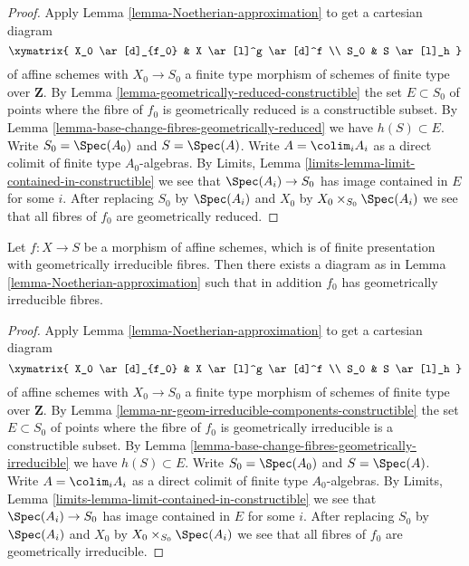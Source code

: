 \begin{proof}
Apply
Lemma \ref{lemma-Noetherian-approximation}
to get a cartesian diagram
$$
\xymatrix{
X_0 \ar[d]_{f_0} & X \ar[l]^g \ar[d]^f \\
S_0 & S \ar[l]_h
}
$$
of affine schemes with $X_0 \to S_0$ a finite type morphism of
schemes of finite type over $\mathbf{Z}$. By
Lemma \ref{lemma-geometrically-reduced-constructible}
the set $E \subset S_0$ of points where the fibre of
$f_0$ is geometrically reduced is a constructible subset. By
Lemma \ref{lemma-base-change-fibres-geometrically-reduced}
we have $h(S) \subset E$. Write $S_0 = \Spec(A_0)$ and
$S = \Spec(A)$. Write $A = \colim_i A_i$ as a
direct colimit of finite type $A_0$-algebras. By
Limits, Lemma \ref{limits-lemma-limit-contained-in-constructible}
we see that $\Spec(A_i) \to S_0$ has image contained in $E$
for some $i$. After replacing $S_0$ by $\Spec(A_i)$ and
$X_0$ by $X_0 \times_{S_0} \Spec(A_i)$ we see that
all fibres of $f_0$ are geometrically reduced.
\end{proof}

\begin{lemma}
\label{lemma-Noetherian-approximation-geometrically-irreducible}
Let $f : X \to S$ be a morphism of affine schemes, which is
of finite presentation with geometrically irreducible fibres.
Then there exists a diagram as in
Lemma \ref{lemma-Noetherian-approximation}
such that in addition $f_0$ has geometrically irreducible fibres.
\end{lemma}

\begin{proof}
Apply
Lemma \ref{lemma-Noetherian-approximation}
to get a cartesian diagram
$$
\xymatrix{
X_0 \ar[d]_{f_0} & X \ar[l]^g \ar[d]^f \\
S_0 & S \ar[l]_h
}
$$
of affine schemes with $X_0 \to S_0$ a finite type morphism of
schemes of finite type over $\mathbf{Z}$. By
Lemma \ref{lemma-nr-geom-irreducible-components-constructible}
the set $E \subset S_0$ of points where the fibre of
$f_0$ is geometrically irreducible is a constructible subset. By
Lemma \ref{lemma-base-change-fibres-geometrically-irreducible}
we have $h(S) \subset E$. Write $S_0 = \Spec(A_0)$ and
$S = \Spec(A)$. Write $A = \colim_i A_i$ as a
direct colimit of finite type $A_0$-algebras. By
Limits, Lemma \ref{limits-lemma-limit-contained-in-constructible}
we see that $\Spec(A_i) \to S_0$ has image contained in $E$
for some $i$. After replacing $S_0$ by $\Spec(A_i)$ and
$X_0$ by $X_0 \times_{S_0} \Spec(A_i)$ we see that
all fibres of $f_0$ are geometrically irreducible.
\end{proof}

